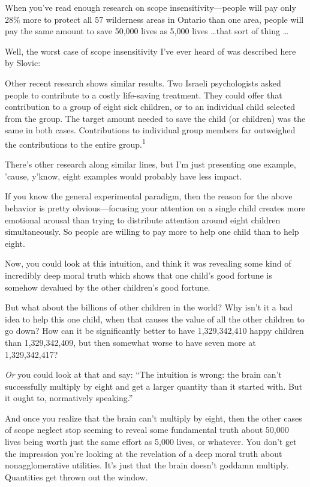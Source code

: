 {
 When you've read enough research on scope
insensitivity---people will pay only 28\% more to protect all 57
wilderness areas in Ontario than one area, people will pay the same
amount to save 50,000 lives as 5,000 lives \ldots that sort of thing
\ldots}

{
 Well, the worst case of scope insensitivity I've
ever heard of was described here by Slovic:}

{
 Other recent research shows similar results. Two Israeli
psychologists asked people to contribute to a costly life-saving
treatment. They could offer that contribution to a group of eight sick
children, or to an individual child selected from the group. The target
amount needed to save the child (or children) was the same in both
cases. Contributions to individual group members far outweighed the
contributions to the entire group.\textsuperscript{1}}

{
 There's other research along similar lines, but
I'm just presenting one example,
'cause, y'know, eight examples would
probably have less impact.}

{
 If you know the general experimental paradigm, then the reason for
the above behavior is pretty obvious---focusing your attention on a
single child creates more emotional arousal than trying to distribute
attention around eight children simultaneously. So people are willing
to pay more to help one child than to help eight.}

{
 Now, you could look at this intuition, and think it was revealing
some kind of incredibly deep moral truth which shows that one
child's good fortune is somehow devalued by the other
children's good fortune.}

{
 But what about the billions of other children in the world? Why
isn't it a bad idea to help this one child, when that
causes the value of all the other children to go down? How can it be
significantly better to have 1,329,342,410 happy children than
1,329,342,409, but then somewhat worse to have seven more at
1,329,342,417?}

{
 \textit{Or} you could look at that and say: ``The
intuition is wrong: the brain can't successfully
multiply by eight and get a larger quantity than it started with. But
it ought to, normatively speaking.''}

{
 And once you realize that the brain can't multiply
by eight, then the other cases of scope neglect stop seeming to reveal
some fundamental truth about 50,000 lives being worth just the same
effort as 5,000 lives, or whatever. You don't get the
impression you're looking at the revelation of a deep
moral truth about nonagglomerative utilities. It's just
that the brain doesn't goddamn multiply. Quantities get
thrown out the window.}

